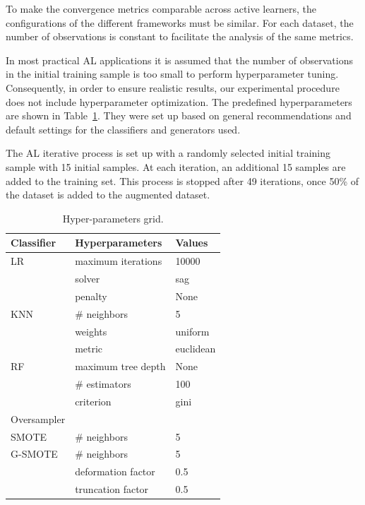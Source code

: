 \documentclass[parskip=full]{scrartcl}
\begin{document}
To make the convergence metrics comparable across active learners, the
configurations of the different frameworks must be similar. For each dataset,
the number of observations is constant to facilitate the analysis of the same
metrics. 

In most practical AL applications it is assumed that the number of observations
in the initial training sample is too small to perform hyperparameter tuning.
Consequently, in order to ensure realistic results, our experimental procedure
does not include hyperparameter optimization. The predefined hyperparameters are
shown in Table~\ref{tab:grid}. They were set up based on general recommendations
and default settings for the classifiers and generators used.

The AL iterative process is set up with a randomly selected initial training
sample with 15 initial samples. At each iteration, an additional 15 samples are
added to the training set. This process is stopped after 49 iterations, once
50\% of the dataset is added to the augmented dataset.

\begin{table}[H]
	\centering
	\begin{tabular}{lll}
		\toprule
		Classifier & Hyperparameters      & Values             \\
		\midrule
		LR         & maximum iterations   & 10000              \\
		           & solver               & sag                \\
                   & penalty              & None               \\
		KNN        & \# neighbors         & 5                  \\
                   & weights              & uniform            \\
                   & metric               & euclidean          \\
		RF         & maximum tree depth   & None               \\
		           & \# estimators        & 100                \\
                   & criterion            & gini               \\
		\toprule
		Oversampler &                     &                    \\
		\midrule
		SMOTE      & \# neighbors         & 5                  \\
		G-SMOTE    & \# neighbors         & 5                  \\
                   & deformation factor   & 0.5                \\
                   & truncation factor    & 0.5                \\
		\bottomrule
	\end{tabular}
    \caption{\label{tab:grid}Hyper-parameters grid.}
\end{table}
\end{document}
